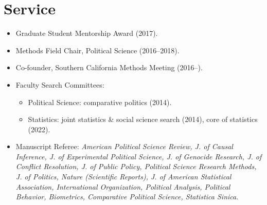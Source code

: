 \documentclass[11pt]{article}
\begin{document}
\section{Service}
\begin{itemize}
\item Graduate Student Mentorship Award (2017).
\item Methods Field Chair, Political Science (2016--2018).
\item Co-founder, Southern California Methods Meeting (2016--).
\item Faculty Search Committees:
  \begin{itemize}
    \item Political Science: comparative politics (2014).
    \item Statistics: joint statistics \& social science search (2014), core of statistics (2022).
  \end{itemize}
\item Manuscript Referee: \emph{American Political Science Review, J. of Causal Inference, J. of Experimental Political Science, J. of Genocide Research, J. of Conflict Resolution, J. of Public Policy, Political Science Research Methods, J. of Politics, Nature (Scientific Reports), J. of American Statistical Association, International Organization, Political Analysis, Political Behavior, Biometrics, Comparative Political Science, Statistica Sinica}.
\end{itemize}

\fi
\end{document}
